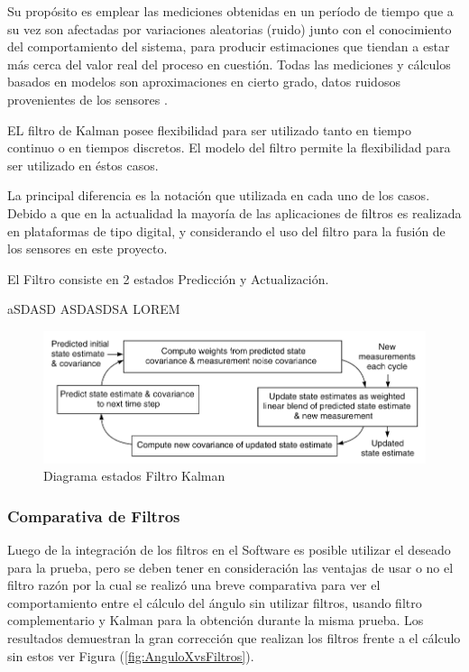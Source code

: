 \documentclass[12pt,a4paper]{article}
\begin{document}
			Su propósito es emplear las mediciones obtenidas en un período de tiempo que a su vez son afectadas por variaciones  aleatorias (ruido) junto con el conocimiento del comportamiento del sistema, para producir estimaciones que tiendan a estar más cerca del valor real del proceso en cuestión. Todas las mediciones y cálculos basados en modelos son aproximaciones en cierto grado, datos ruidosos provenientes de los sensores \cite[Capítulo 3, p.~45]{TesisUSM}. 
			
			EL filtro de Kalman posee flexibilidad para ser utilizado tanto en tiempo continuo o en tiempos discretos. El modelo del filtro permite la flexibilidad para ser utilizado en éstos casos.
			
			La principal diferencia es la notación que utilizada en cada uno de los casos.
			Debido a que en la actualidad la mayoría de las aplicaciones de filtros es realizada en plataformas de tipo digital, y considerando el uso del filtro para la fusión de los sensores en este proyecto.
			
			El Filtro consiste en 2 estados Predicción y Actualización.
			
			aSDASD
			ASDASDSA LOREM
			
			\begin{figure}[H]
				\centering
				\includegraphics[scale=0.5]{images/kalman-filter.png} 
				\caption{Diagrama estados Filtro Kalman}
				\label{fig:diagramakalman}
			\end{figure}
			
			
			\subsubsection{Comparativa de Filtros}
			Luego de la integración de los filtros en el Software es posible utilizar el deseado para la prueba, pero se deben tener en consideración las ventajas de usar o no el filtro razón por la cual se realizó una breve comparativa para ver el comportamiento entre el cálculo del ángulo sin utilizar filtros, usando filtro complementario y Kalman para la obtención durante la misma prueba.
			Los resultados demuestran la gran corrección que realizan los filtros frente a el cálculo sin estos ver Figura (\ref{fig:AnguloXvsFiltros}).
			
\end{document}
